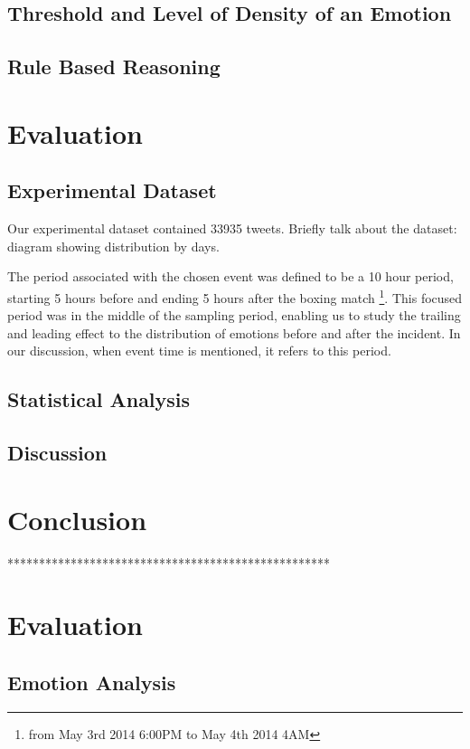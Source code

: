 \subsection{Threshold and Level of Density of an Emotion}

\subsection{Rule Based Reasoning}

\section{Evaluation}

\subsection{Experimental Dataset}
Our experimental dataset contained 33935 tweets. Briefly talk about the dataset: diagram showing distribution by days.

The period associated with the chosen event was defined to be a 10 hour period, starting 5 hours before and ending 5 hours after the boxing match \footnote{from May 3rd 2014 6:00PM to May 4th 2014 4AM}. This focused period was in the middle of the sampling period, enabling us to study the trailing and leading effect to the distribution of emotions before and after the incident. In our discussion, when event time is mentioned, it refers to this period.

\subsection{Statistical Analysis}

\subsection{Discussion}

\section{Conclusion}

***************************************************

\section{Evaluation}
\subsection{Emotion Analysis}

